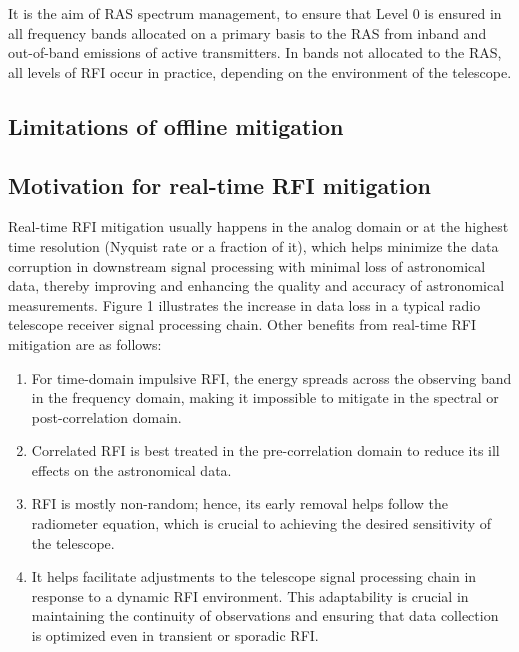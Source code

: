 It is the aim of RAS spectrum management, to ensure that Level 0 is ensured in all frequency bands allocated on a primary basis to the RAS from inband and out-of-band emissions of active transmitters. In bands not allocated to the RAS, all levels of RFI occur in practice, depending on the environment of the telescope. 

\subsection{Limitations of offline mitigation}
\label{subsection:hardware:introduction:limitations_offline}

\subsection{Motivation for real-time RFI mitigation}
\label{subsection:hardware:introduction: motivations}

Real-time RFI mitigation usually happens in the analog domain or at the highest time resolution (Nyquist rate or a fraction of it), which helps minimize the data corruption in downstream signal processing with minimal loss of astronomical data, thereby improving and enhancing the quality and accuracy of astronomical measurements. Figure 1 illustrates the increase in data loss in a typical radio telescope receiver signal processing chain.
Other benefits from real-time RFI mitigation are as follows:

\begin{enumerate}
\item For time-domain impulsive RFI, the energy spreads across the observing band in the frequency domain, making it impossible to mitigate in the spectral or post-correlation domain.

\item Correlated RFI is best treated in the pre-correlation domain to reduce its ill effects on the astronomical data.

\item RFI is mostly non-random; hence, its early removal helps follow the radiometer equation, which is crucial to achieving the desired sensitivity of the telescope.

\item It helps facilitate adjustments to the telescope signal processing chain in response to a dynamic RFI environment. This adaptability is crucial in maintaining the continuity of observations and ensuring that data collection is optimized even in transient or sporadic RFI.
\end{enumerate}


